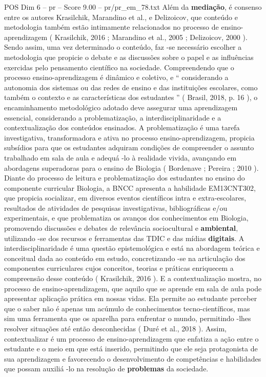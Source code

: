 \begin{textsample}{POS Dim 6 – pr – Score 9.00 – pr/pr\_em\_78.txt}
Além da \textbf{mediação}, é consenso entre os autores Krasilchik, Marandino et al., e Delizoicov, que conteúdo e metodologia também estão intimamente relacionados no processo de ensino-aprendizagem ( Krasilchik, 2016 ; Marandino et al., 2005 ; Delizoicov, 2000 ).
Sendo assim, uma vez determinado o conteúdo, faz -se necessário escolher a metodologia que propicie o debate e as discussões sobre o papel e as influências exercidas pelo pensamento científico na sociedade.
Compreendendo que o processo ensino-aprendizagem é dinâmico e coletivo, e “ considerando a autonomia dos sistemas ou das redes de ensino e das instituições escolares, como também o contexto e as características dos estudantes ” ( Brasil, 2018, p. 16 ), o encaminhamento metodológico adotado deve assegurar uma aprendizagem essencial, considerando a problematização, a interdisciplinaridade e a contextualização dos conteúdos ensinados.
A problematização é uma tarefa investigativa, transformadora e ativa no processo ensino-aprendizagem, propicia subsídios para que os estudantes adquiram condições de compreender o assunto trabalhado em sala de aula e adequá -lo à realidade vivida, avançando em abordagens superadoras para o ensino de Biologia ( Bordenave ; Pereira ; 2010 ).
Diante do processo de leitura e problematização dos estudantes no ensino do componente curricular Biologia, a BNCC apresenta a habilidade EM13CNT302, que propicia socializar, em diversos eventos científicos intra e extra-escolares, resultados de atividades de pesquisas investigativas, bibliográficas e/ou experimentais, e que problematiza os avanços dos conhecimentos em Biologia, promovendo discussões e debates de relevância sociocultural e \textbf{ambiental}, utilizando -se dos recursos e ferramentas das TDIC e das mídias \textbf{digitais}.
A interdisciplinaridade é uma questão epistemológica e está na abordagem teórica e conceitual dada ao conteúdo em estudo, concretizando -se na articulação dos componentes curriculares cujos conceitos, teorias e práticas enriquecem a compreensão desse conteúdo ( Krasilchik, 2016 ).
E a contextualização mostra, no processo de ensino-aprendizagem, que aquilo que se aprende em sala de aula pode apresentar aplicação prática em nossas vidas.
Ela permite ao estudante perceber que o saber não é apenas um acúmulo de conhecimentos tecno-científicos, mas sim uma ferramenta que os aparelha para enfrentar o mundo, permitindo -lhes resolver situações até então desconhecidas ( Duré et al., 2018 ).
Assim, contextualizar é um processo de ensino-aprendizagem que enfatiza a ação entre o estudante e o meio em que está inserido, permitindo que ele seja protagonista de sua aprendizagem e favorecendo o desenvolvimento de competências e habilidades que possam auxiliá -lo na resolução de \textbf{problemas} da sociedade.

\end{textsample}
